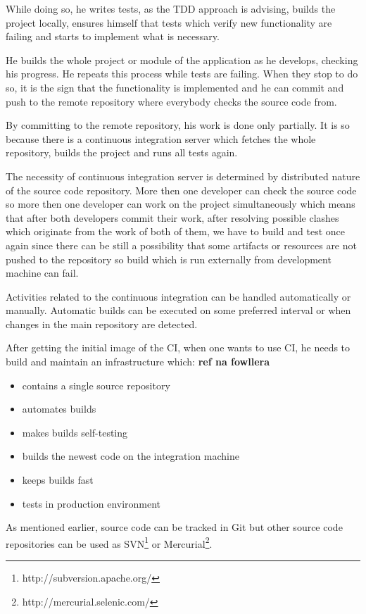 \documentclass[12pt,final,oneside]{fithesis}
\begin{document}
While doing so, he writes tests, as the TDD approach is advising, builds the project locally, ensures himself that tests which verify new functionality are failing and starts to implement what is necessary.

He builds the whole project or module of the application as he develops, checking his progress. He repeats this process while tests are failing. When they stop to do so, it is the sign that the functionality is implemented and he can commit and push to the remote repository where everybody checks the source code from.

By committing to the remote repository, his work is done only partially. It is so because there is a continuous integration server which fetches the whole repository, builds the project and runs all tests again.

The necessity of continuous integration server is determined by distributed nature of the source code repository. More then one developer can check the source code so more then one developer can work on the project simultaneously which means that after both developers commit their work, after resolving possible clashes which originate from the work of both of them, we have to build and test once again since there can be still a possibility that some artifacts or resources are not pushed to the repository so build which is run externally from development machine can fail.

Activities related to the continuous integration can be handled automatically or manually. Automatic builds can be executed on some preferred interval or when changes in the main repository are detected.

After getting the initial image of the CI, when one wants to use CI, he needs to build and maintain an infrastructure which: \textbf{ref na fowllera}

\begin{itemize}
	\item{contains a single source repository}
	\item{automates builds}
	\item{makes builds self-testing}
	\item{builds the newest code on the integration machine}
	\item{keeps builds fast}
	\item{tests in production environment}
\end{itemize}

As mentioned earlier, source code can be tracked in Git but other source code repositories can be used as SVN\footnote{http://subversion.apache.org/} or Mercurial\footnote{http://mercurial.selenic.com/}.
\end{document}
